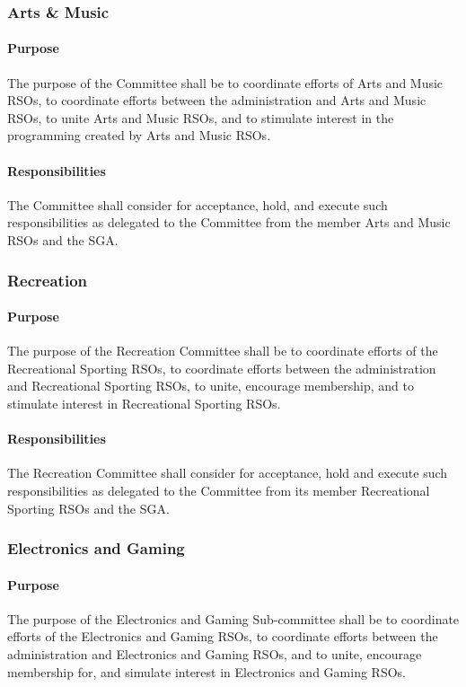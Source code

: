 \documentclass[12pt]{scrreprt}
\begin{document}
\subsubsection{Arts \& Music}

\paragraph{Purpose}
The purpose of the Committee shall be to coordinate efforts of Arts and Music 
RSOs, to coordinate efforts between the administration and Arts and Music 
RSOs, to unite Arts and Music RSOs, and to stimulate interest in the 
programming created by Arts and Music RSOs.

\paragraph{Responsibilities}
The Committee shall consider for acceptance, hold, and execute such 
responsibilities as delegated to the Committee from the member Arts and Music 
RSOs and the SGA.

\subsubsection{Recreation}

\paragraph{Purpose}
The purpose of the Recreation Committee shall be to coordinate efforts of the 
Recreational Sporting RSOs, to coordinate efforts between the administration 
and Recreational Sporting RSOs, to unite, encourage membership, and to 
stimulate interest in Recreational Sporting RSOs.

\paragraph{Responsibilities}
The Recreation Committee shall consider for acceptance, hold and execute such
responsibilities as delegated to the Committee from its member Recreational
Sporting RSOs and the SGA.

\subsubsection{Electronics and Gaming}

\paragraph{Purpose}
The purpose of the Electronics and Gaming Sub-committee shall be to coordinate efforts of the Electronics and Gaming RSOs, to coordinate efforts between the administration and Electronics and Gaming RSOs, and to unite, encourage membership for, and simulate interest in Electronics and Gaming RSOs.
\end{document}
